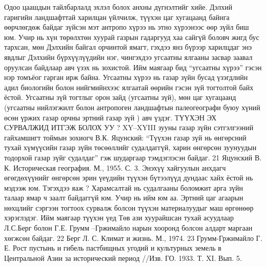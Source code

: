 Одоо цаашдын тайлбарлалд эхлэл болох анхны дүгнэлтийг хийе. Дэлхий гаригийн ландшафттай харилцан үйлчилж, түүхэн цаг хугацаанд байнга өөрчлөгдөж байдаг зүйсэн мэт антропо хүрээ нь этно хүрээнээс өөр зүйл биш юм. Учир нь хүн төрөлхтөн хуурай газрын гадаргууд хаа сайгүй боловч жигд бус тархсан, мөн Дэлхийн байгал орчинтой ямагт, гэхдээ янз бүрээр харилцдаг энэ явдлыг Дэлхийн бүрхүүлүүдийн нэг, чингэхдээ угсаатны ялгааны засвар заавал оруулсан байдлаар авч үзэх нь зохистой. Ийм маягаар бид “угсаатны хүрээ” гэсэн нэр томъёог гарган ирж байна. Угсаатны хүрээ нь газар зүйн бусад үзэгдлийн адил биологийн болон нийгмийнхээс ялгаатай өөрийн гэсэн зүй тогтолтой байх ёстой. Угсаатны зүй тогтлыг орон зайд (угсаатны зүй), мөн цаг хугацаанд (угсаатны нийлэгжилт болон антропоген ландшафтын палеогеографи буюу хүний өсөн үржих газар орчны эртний газар зүй ) авч үздэг.
ТҮҮХЭН ЭХ СУРВАЛЖИД ИТГЭЖ БОЛОХ УУ ?
XY–XYIII зууны газар зүйн сэтгэлгээний гайхамшигт тоймын зохиогч В.К. Яцунский: “Түүхэн газар зүй нь өнгөрсний тухай хүмүүсийн газар зүйн төсөөллийг судалдаггүй, харин өнгөрсөн зуунуудын тодорхой газар зүйг судалдаг” гэж шударгаар тэмдэглэсэн байдаг.
21 Яцунский В. К. Историческая география. М., 1955. С. 3.
Энэхүү хайгуулын анхдагч өгөгдөхүүнийг өнгөрсөн эрин үеүдийн түүхэн бүтээлүүд дундаас хайх ёстой нь мэдээж юм. Тэгэхдээ яаж ? Харамсалтай нь судалгааны боломжит арга зүйн талаар ямар ч заалт байдаггүй юм. Учир нь ийм юм аа.
Эртний цаг агаарын нөхцлийг сэргээн тогтоох сурвалж болсон түүхэн материалуудыг маш өргөнөөр хэрэглэдэг. Ийм маягаар түүхэн үед Төв ази хуурайшсан тухай асуудлаар Л.С.Берг болон Г.Е. Грумм –Гржимайло нарын хооронд болсон алдарт маргаан хөгжсөн байдаг.
22 Берг Л. С. Климат и жизнь. М., 1974. 23 Грумм-Гржимайло Г. Е. Рост пустынь и гибель пастбищных угодий и культурных земель в Центральной Азии за исторический период //Изв. ГО. 1933. Т. XI. Вып. 5.

